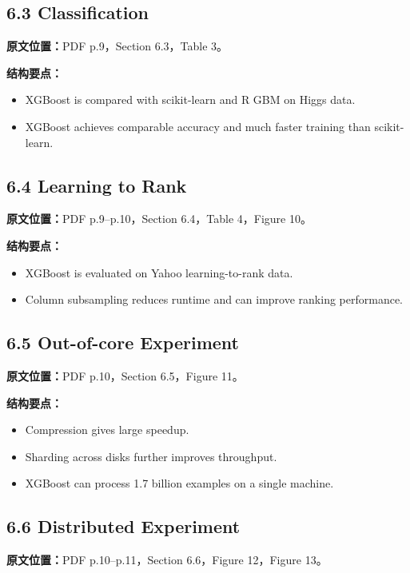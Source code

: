 \subsection{6.3 Classification}

\textbf{原文位置：}PDF p.9，Section 6.3，Table 3。

\textbf{结构要点：}
\begin{itemize}
  \item XGBoost is compared with scikit-learn and R GBM on Higgs data.
  \item XGBoost achieves comparable accuracy and much faster training than scikit-learn.
\end{itemize}

\subsection{6.4 Learning to Rank}

\textbf{原文位置：}PDF p.9--p.10，Section 6.4，Table 4，Figure 10。

\textbf{结构要点：}
\begin{itemize}
  \item XGBoost is evaluated on Yahoo learning-to-rank data.
  \item Column subsampling reduces runtime and can improve ranking performance.
\end{itemize}

\subsection{6.5 Out-of-core Experiment}

\textbf{原文位置：}PDF p.10，Section 6.5，Figure 11。

\textbf{结构要点：}
\begin{itemize}
  \item Compression gives large speedup.
  \item Sharding across disks further improves throughput.
  \item XGBoost can process 1.7 billion examples on a single machine.
\end{itemize}

\subsection{6.6 Distributed Experiment}

\textbf{原文位置：}PDF p.10--p.11，Section 6.6，Figure 12，Figure 13。

